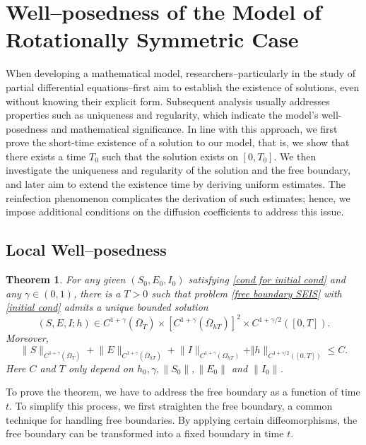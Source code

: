 \documentclass[11pt]{amsart}
\numberwithin{equation}{section}
\theoremstyle{plain}
\newtheorem{theorem}{Theorem}[section]
\theoremstyle{definition}
\begin{document}
\section{Well--posedness of the Model of Rotationally Symmetric Case}

When developing a mathematical model, researchers--particularly in the study of partial differential equations--first aim to establish the existence of solutions, even without knowing their explicit form. Subsequent analysis usually addresses properties such as uniqueness and regularity, which indicate the model's well-posedness and mathematical significance. In line with this approach, we first prove the short-time existence of a solution to our model, that is, we show that there exists a time $T_0$ such that the solution exists on $[0,T_0]$. We then investigate the uniqueness and regularity of the solution and the free boundary, and later aim to extend the existence time by deriving uniform estimates. The reinfection phenomenon complicates the derivation of such estimates; hence, we impose additional conditions on the diffusion coefficients to address this issue.

\subsection{Local Well--posedness}

	\begin{theorem}\label{shorttime}
		For any given $(S_0,E_0,I_0)$ satisfying \cref{cond for initial cond} and any $\gamma \in (0,1)$, there is a $T>0$ such that problem \cref{free boundary SEIS} with \cref{initial cond} admits a unique bounded solution \begin{equation*}
			(S, E, I; h) \in C^{1+\gamma}(\overline\Omega_T) \times [C^{1+\gamma}(\overline\Omega_{hT})]^2 \times C^{1+\gamma/2}([0,T]).
			\end{equation*}
			Moreover,
			\begin{equation*}
			\lVert S \rVert_{C^{1+\gamma}(\overline\Omega_T)}+\lVert E \rVert _{C^{1+\gamma}(\overline\Omega_{hT})} + \lVert I \rVert _{C^{1+\gamma}(\Omega_{hT})}+\Vert h \rVert _{C^{1+\gamma/2}([0,T])} \leq C.
	\end{equation*}
	Here $C$ and $T$ only depend on $h_0, \gamma, \lVert S_0 \rVert , \lVert E_0 \rVert $ and $\lVert I_0 \rVert$.
	\end{theorem}
To prove the theorem, we have to address the free boundary as a function of time $t$. To simplify this process, we first straighten the free boundary, a common technique for handling free boundaries. By applying certain diffeomorphisms, the free boundary can be transformed into a fixed boundary in time $t$.
\end{document}
